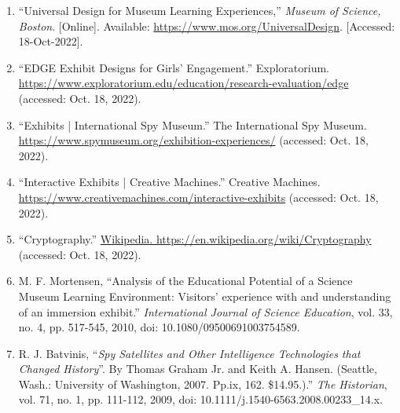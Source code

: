 \begin{enumerate}

  \item “Universal Design for Museum Learning Experiences,” \textit{Museum of Science, Boston}. [Online]. Available: \href{https://www.mos.org/UniversalDesign}{https://www.mos.org/UniversalDesign}. [Accessed: 18-Oct-2022]. 

  \item “EDGE Exhibit Designs for Girls’ Engagement.” Exploratorium.  \\\href{https://www.exploratorium.edu/education/research-evaluation/edge}{https://www.exploratorium.edu/education/research-evaluation/edge} (accessed: Oct. 18, 2022).

  \item “Exhibits | International Spy Museum.” The International Spy Museum.\\ \href{https://www.spymuseum.org/exhibition-experiences/}{https://www.spymuseum.org/exhibition-experiences/} (accessed: Oct. 18, 2022).

  \item “Interactive Exhibits | Creative Machines.” Creative Machines.\\ \href{https://www.creativemachines.com/interactive-exhibits}{https://www.creativemachines.com/interactive-exhibits} (accessed: Oct. 18, 2022).

  \item “Cryptography.” \href{Wikipedia. https://en.wikipedia.org/wiki/Cryptography}{Wikipedia. https://en.wikipedia.org/wiki/Cryptography} (accessed: Oct. 18, 2022).

  \item M. F. Mortensen, “Analysis of the Educational Potential of a Science Museum Learning Environment: Visitors’ experience with and understanding of an immersion exhibit.” \textit{International Journal of Science Education}, vol. 33, no. 4, pp. 517-545, 2010, doi: 10.1080/09500691003754589. 

  \item R. J. Batvinis, ``\textit{Spy Satellites and Other Intelligence Technologies that Changed History}''. By Thomas Graham Jr. and Keith A. Hansen. (Seattle, Wash.: University of Washington, 2007. Pp.ix, 162. \$14.95.).” \textit{The Historian}, vol. 71, no. 1, pp. 111-112, 2009, doi: 10.1111/j.1540-6563.2008.00233\_14.x.

\end{enumerate}



